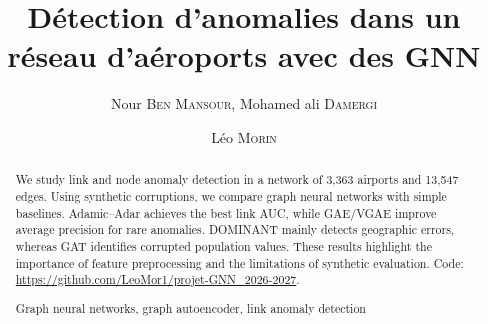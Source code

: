 \documentclass[french]{cls/llncs}
\title{Détection d'anomalies dans un réseau d'aéroports avec des GNN}
\author{Nour \textsc{Ben Mansour}, Mohamed ali \textsc{Damergi} \and Léo \textsc{Morin}}
\institute{Université Claude Bernard Lyon 1, France}
\begin{document}
\maketitle

\begin{abstract}
We study link and node anomaly detection in a network of 3,363 airports and 13,547 edges. Using synthetic corruptions, we compare graph neural networks with simple baselines. Adamic–Adar achieves the best link AUC, while GAE/VGAE improve average precision for rare anomalies. DOMINANT mainly detects geographic errors, whereas GAT identifies corrupted population values. These results highlight the importance of feature preprocessing and the limitations of synthetic evaluation.
Code: \url{https://github.com/LeoMor1/projet-GNN_2026-2027}.
\begin{keywords}
Graph neural networks, graph autoencoder, link anomaly detection
\end{keywords}
\end{abstract}


          
     
{\let\clearpage\relax %
}     

{\scriptsize
\setlength{\itemsep}{0pt}\setlength{\parskip}{0pt}


}
\end{document}
